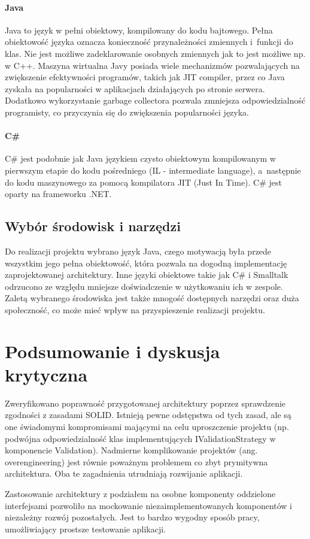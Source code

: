 \documentclass[12pt]{article}
\begin{document}
\paragraph{Java}
Java to język w pełni obiektowy, kompilowany do kodu bajtowego. Pełna obiektowość języka oznacza konieczność przynależności zmiennych i~funkcji do klas. Nie jest możliwe zadeklarowanie osobnych zmiennych jak to jest możliwe np. w C++. Maszyna wirtualna Javy posiada wiele mechanizmów pozwalających na zwiększenie efektywności programów, takich jak JIT compiler, przez co Java zyskała na popularności w aplikacjach działających po stronie serwera. Dodatkowo wykorzystanie garbage collectora pozwala zmniejsza odpowiedzialność programisty, co przyczynia się do zwiększenia popularności języka.

\paragraph{C\#}
C\# jest podobnie jak Java językiem czysto obiektowym kompilowanym w pierwszym etapie do kodu pośredniego (IL - intermediate language), a~następnie do kodu maszynowego za pomocą kompilatora JIT (Just In Time). C\# jest oparty na frameworku .NET.

\subsection{Wybór środowisk i narzędzi}
Do realizacji projektu wybrano język Java, czego motywacją była przede wszystkim jego pełna obiektowość, która pozwala na dogodną implementację zaprojektowanej architektury.
Inne języki obiektowe takie jak C\# i Smalltalk odrzucono ze względu mniejsze doświadczenie w użytkowaniu ich w zespole.
Zaletą wybranego środowiska jest także mnogość dostępnych narzędzi oraz duża społeczność, co może mieć wpływ na przyspieszenie realizacji projektu.


\section{Podsumowanie i dyskusja krytyczna}

Zweryfikowano poprawność przygotowanej architektury poprzez sprawdzenie zgodności z zasadami SOLID. Istnieją pewne odstępstwa od tych zasad, ale są one świadomymi kompromisami mającymi na celu uproszczenie projektu (np. podwójna odpowiedzialność klas implementujących IValidationStrategy w komponencie Validation). Nadmierne komplikowanie projektów (ang. overengineering) jest równie poważnym problemem co zbyt prymitywna architektura. Oba te zagadnienia utrudniają rozwijanie aplikacji.

Zastosowanie architektury z podziałem na osobne komponenty oddzielone interfejsami pozwoliło na mockowanie niezaimplementowanych komponentów i niezależny rozwój pozostałych. Jest to bardzo wygodny sposób pracy, umożliwiający prostsze testowanie aplikacji.



\newpage
\listoffigures
\end{document}

